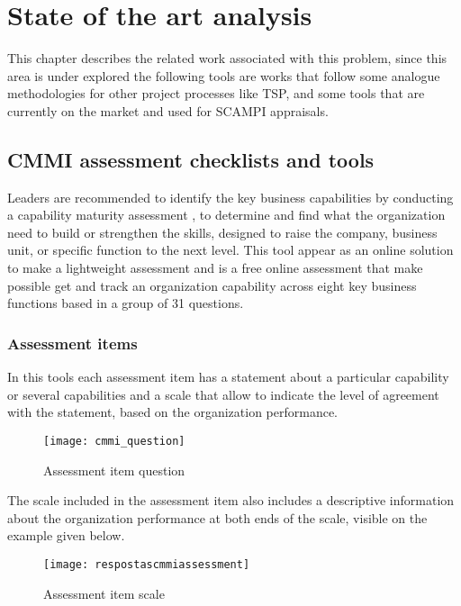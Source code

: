 \chapter{State of the art analysis}\label{chap:chap3}

This chapter describes the related work associated with this problem, since this area is under explored the following tools are works that follow some analogue methodologies for other project processes like TSP, and some tools that are currently on the market and used for SCAMPI appraisals.

\section{CMMI assessment checklists and tools}
Leaders are recommended to identify the key business capabilities  by conducting a capability maturity assessment \citep{Hutchinson2014}, to determine and find what the organization need to build or strengthen the skills, designed to raise the company, business unit, or specific function to the next level. This tool appear as an online solution to make a lightweight assessment and is a free online assessment that make possible get and track an organization capability across eight key business functions based in a group of 31 questions.


\subsection{Assessment items}
In this tools each assessment item has a statement about a particular capability or several capabilities and a scale that allow to indicate the level of agreement with the statement, based on the organization performance. 

\begin{figure}[h]
	\begin{center}
		\leavevmode
		\texttt{[image: cmmi\_question]}
		\caption{Assessment item question}
		\label{fig:cmmi_question}
	\end{center}
\end{figure}

The scale included in the assessment item also includes a descriptive information about the organization performance at both ends of the scale, visible on the example given below.

\begin{figure}[h]
	\begin{center}
		\leavevmode
		\texttt{[image: respostascmmiassessment]}
		\caption{Assessment item scale}
		\label{fig:assesment_answer}
	\end{center}
\end{figure}

